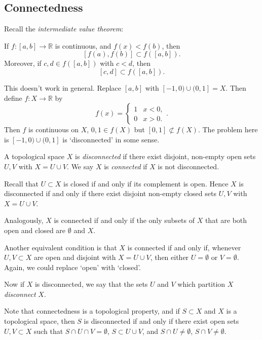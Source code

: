 \documentclass[12pt]{article}
\begin{document}
\subsection{Connectedness}%
\label{sub:connectedness}

Recall the \textit{intermediate value theorem}:
\begin{center}
	If $f : [a, b] \to \mathbb{R}$ is continuous, and $f(x) < f(b)$, then
	\[
		[f(a), f(b)] \subset f([a, b])
	.\]
	Moreover, if $c, d \in f([a, b])$ with $c < d$, then
	\[
		[c, d] \subset f([a, b])
	.\]
\end{center}

This doesn't work in general. Replace $[a, b]$ with $[-1, 0) \cup (0, 1] = X$. Then define $f : X \to \mathbb{R}$ by
\[
	f(x) = 
	\begin{cases}
		1 & x < 0, \\
		0 & x > 0.
	\end{cases}	
.\]
Then $f$ is continuous on $X$, $0, 1 \in f(X)$ but $[0, 1] \not \subset f(X)$. The problem here is $[-1, 0) \cup (0, 1]$ is `disconnected' in some sense.

\begin{definition}
	A topological space $X$ is \textit{disconnected} if there exist disjoint, non-empty open sets $U, V$ with $X = U \cup V$. We say $X$ is \textit{connected} if $X$ is not disconnected.
\end{definition}

\begin{remark}
	Recall that $U \subset X$ is closed if and only if its complement is open. Hence $X$ is disconnected if and only if there exist disjoint non-empty closed sets $U, V$ with $X = U \cup V$.

	Analogously, $X$ is connected if and only if the only subsets of $X$ that are both open and closed are $\emptyset$ and $X$.

	Another equivalent condition is that $X$ is connected if and only if, whenever $U, V \subset X$ are open and disjoint with $X = U \cup V$, then either $U = \emptyset$ or $V = \emptyset$. Again, we could replace `open' with `closed'.

	Now if $X$ is disconnected, we say that the sets $U$ and $V$ which partition $X$ \textit{disconnect} $X$.
\end{remark}

Note that connectedness is a topological property, and if $S \subset X$ and $X$ is a topological space, then $S$ is disconnected if and only if there exist open sets $U, V \subset X$ such that $S \cap U \cap V = \emptyset$, $S \subset U \cup V$, and $S \cap U \neq \emptyset$, $S \cap V \neq \emptyset$.
\end{document}
